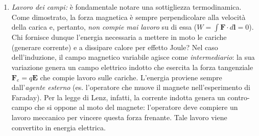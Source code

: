\documentclass[a4paper,11pt]{report}
\begin{document}
\begin{enumerate}
    Si immagini di avere una spira circolare $\gamma$ immersa in una regione di campo magnetico tempo-variante: il verso con cui fluisce corrente indotta nel circuito (orario o antiorario) è dettato dal contributo di Lenz: \textit{la corrente scorre in modo tale da generare un contro-campo che si opponga alla variazione del flusso del campo esterno.}
    
    \item \textit{Lavoro dei campi:}
è fondamentale notare una sottigliezza termodinamica.
    Come dimostrato, la forza magnetica è sempre perpendicolare alla velocità della carica e, pertanto, \textit{non compie mai lavoro} su di essa ($W = \int \bm{F} \cdot d\bm{l} = 0$).
    Chi fornisce dunque l'energia necessaria a mettere in moto le cariche (generare corrente) e a dissipare calore per effetto Joule?
Nel caso dell'induzione, il campo magnetico variabile agisce come \textit{intermediario}: la sua variazione genera un {campo elettrico indotto} che esercita la forza tangenziale $\bm{F}_e = q\bm{E}$ che compie lavoro sulle cariche.
         L'energia proviene sempre dall'\textit{agente esterno} (es. l'operatore che muove il magnete nell'esperimento di Faraday). Per la legge di Lenz, infatti, la corrente indotta genera un contro-campo che si oppone al moto del magnete: l'operatore deve compiere un lavoro meccanico per vincere questa forza frenante. Tale lavoro viene convertito in energia elettrica.


    \end{enumerate}
\end{document}
